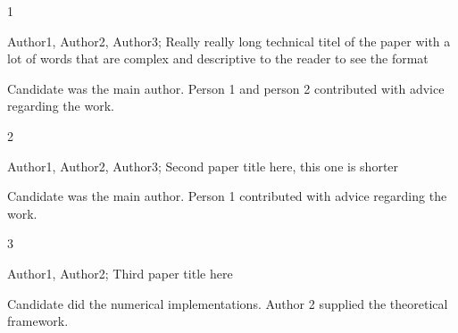 {1} 

{Author1, Author2, Author3; Really really long technical titel of the paper with a lot of words that are complex and descriptive to the reader to see the format} 

{Candidate was the main author. Person 1 and person 2 contributed with advice regarding the work.}

{2} 

{Author1, Author2, Author3; Second paper title here, this one is shorter} 

{Candidate was the main author. Person 1 contributed with advice regarding the work.}

{3} 

{Author1, Author2; Third paper title here} 

{Candidate did the numerical implementations. Author 2 supplied the theoretical framework.}
